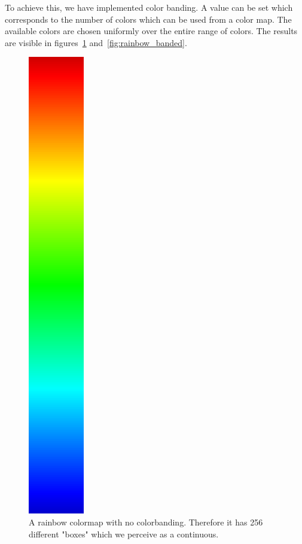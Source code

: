 		To achieve this, we have implemented color banding. 
		A value can be set which corresponds to the number of colors which can be used from a color map.
		The available colors are chosen uniformly over the entire range of colors.
		The results are visible in figures~\ref{fig:rainbow} and~\ref{fig:rainbow_banded}.
		\begin{figure}[htb]
			  \centering
			  \includegraphics[angle=270, width=\linewidth, totalheight=1em, frame]{./content/pictures/rainbow.png}
			  \caption{A rainbow colormap with no colorbanding. Therefore it has 256 different "boxes" which we perceive as a continuous. }
			  \label{fig:rainbow}
		\end{figure}
